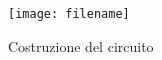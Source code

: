     \begin{figure}
        \texttt{[image: filename]}
        \caption{Costruzione del circuito}
    \end{figure}